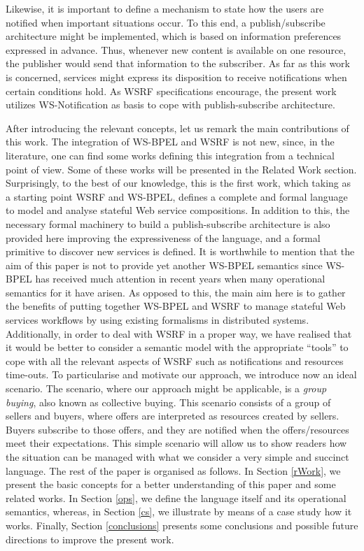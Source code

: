 Likewise, it is important to define a mechanism to state how the users are notified when important situations occur. To this end, a publish/subscribe architecture might be implemented, which is based on information preferences expressed in advance. Thus, whenever new content is available on one resource, the publisher would send that information to the subscriber. As far as this work is concerned, services might express its disposition to receive notifications when certain conditions hold. As WSRF specifications encourage, the present work utilizes WS-Notification as basis to cope with publish-subscribe architecture.

After introducing the relevant concepts, let us remark the main contributions of this work. The integration of WS-BPEL and WSRF is not new, since, in the literature, one can find some works defining this integration from a technical point of view. Some of these works will be presented in the Related Work section. Surprisingly, to the best of our knowledge, this is the first work, which taking as a starting point WSRF and WS-BPEL, defines a complete and formal language to model and analyse stateful Web service compositions. In addition to this, the necessary formal machinery to build a publish-subscribe architecture is also provided here improving the expressiveness of the language, and a formal primitive to discover new services is defined. It is worthwhile to mention that the aim of this paper is not to provide yet another WS-BPEL semantics since WS-BPEL has received much attention in recent years when many operational semantics for it have arisen. As opposed to this, the main aim here is to gather the benefits of putting together WS-BPEL and WSRF to manage stateful Web services workflows by using existing formalisms in distributed systems. Additionally, in order to deal with WSRF in a proper way, we have realised that it would be better to consider a semantic model with the appropriate ``tools'' to cope with all the relevant aspects of WSRF such as notifications and resources time-outs. To particularise and motivate our approach, we introduce now an ideal scenario.
The scenario, where our approach might be applicable, is a \textsl{group buying}, also known as collective buying.
This scenario consists of a group of sellers and buyers, where offers are interpreted as resources created by sellers. Buyers subscribe to those offers, and they are notified when the offers/resources
meet their expectations. This simple scenario will allow us to show readers how the situation can be managed
with what we consider a very simple and succinct language.
The rest of the paper is organised as follows. In Section \ref{rWork}, we present the basic concepts for a better understanding of this paper and some related works. In Section \ref{ops}, we define the language itself and its operational semantics, whereas, in Section \ref{cs}, we illustrate by means of a case study how it works. Finally, Section \ref{conclusions} presents some conclusions and possible future directions to improve the present work.

